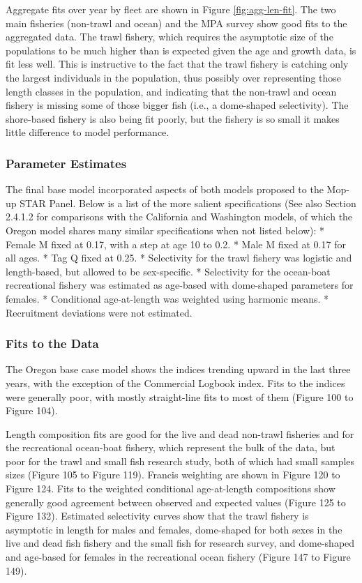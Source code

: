 \documentclass[11pt,
  english,
  letterpaper,
]{article}
\begin{document}
Aggregate fits over year by fleet are shown in Figure \ref{fig:agg-len-fit}. The two main fisheries (non-trawl and ocean) and the MPA survey show good fits to the aggregated data. The trawl fishery, which requires the asymptotic size of the populations to be much higher than is expected given the age and growth data, is fit less well. This is instructive to the fact that the trawl fishery is catching only the largest individuals in the population, thus possibly over representing those length classes in the population, and indicating that the non-trawl and ocean fishery is missing some of those bigger fish (i.e., a dome-shaped selectivity). The shore-based fishery is also being fit poorly, but the fishery is so small it makes little difference to model performance.

\hypertarget{parameter-estimates}{%
\subsubsection{Parameter Estimates}\label{parameter-estimates}}

The final base model incorporated aspects of both models proposed to the Mop-up STAR Panel. Below is a list of the more salient specifications (See also Section 2.4.1.2 for comparisons with the California and Washington models, of which the Oregon model shares many similar specifications when not listed below): * Female M fixed at 0.17, with a step at age 10 to 0.2. * Male M fixed at 0.17 for all ages. * Tag Q fixed at 0.25. * Selectivity for the trawl fishery was logistic and length-based, but allowed to be sex-specific. * Selectivity for the ocean-boat recreational fishery was estimated as age-based with dome-shaped parameters for females. * Conditional age-at-length was weighted using harmonic means. * Recruitment deviations were not estimated.

\hypertarget{fits-to-the-data-1}{%
\subsubsection{Fits to the Data}\label{fits-to-the-data-1}}

The Oregon base case model shows the indices trending upward in the last three years, with the exception of the Commercial Logbook index. Fits to the indices were generally poor, with mostly straight-line fits to most of them (Figure 100 to Figure 104).

Length composition fits are good for the live and dead non-trawl fisheries and for the recreational ocean-boat fishery, which represent the bulk of the data, but poor for the trawl and small fish research study, both of which had small samples sizes (Figure 105 to Figure 119). Francis weighting are shown in Figure 120 to Figure 124. Fits to the weighted conditional age-at-length compositions show generally good agreement between observed and expected values (Figure 125 to Figure 132). Estimated selectivity curves show that the trawl fishery is asymptotic in length for males and females, dome-shaped for both sexes in the live and dead fish fishery and the small fish for research survey, and dome-shaped and age-based for females in the recreational ocean fishery (Figure 147 to Figure 149).
\end{document}
